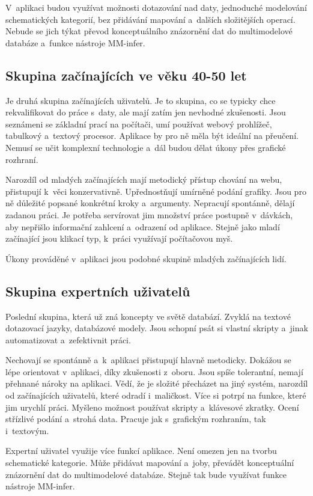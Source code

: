 V~aplikaci budou využívat možnosti dotazování nad daty, jednoduché modelování schematických kategorií, bez přidávání mapování a~dalších složitějších operací. Nebude se jich týkat převod konceptuálního znázornění dat do multimodelové databáze a~funkce nástroje MM-infer.

\subsection{Skupina začínajících ve věku 40-50 let}

Je druhá skupina začínajících uživatelů. Je to skupina, co se typicky chce rekvalifikovat do práce s~daty, ale mají zatím jen nevhodné zkušenosti. Jsou seznámeni se základní prací na počítači, umí používat webový prohlížeč, tabulkový a~textový procesor. Aplikace by pro ně měla být ideální na přeučení. Nemusí se učit komplexní technologie a~dál budou dělat úkony přes grafické rozhraní.

Narozdíl od mladých začínajících mají metodický přístup chování na webu, přistupují k~věci konzervativně. Upřednostňují umírněné podání grafiky. Jsou pro ně důležité popsané konkrétní kroky a~argumenty. Nepracují spontánně, dělají zadanou práci. Je potřeba servírovat jim množství práce postupně v~dávkách, aby nepřišlo informační zahlcení a~odrazení od aplikace. Stejně jako mladí začínající jsou klikací typ, k~práci využívají počítačovou myš. 

Úkony prováděné v~aplikaci jsou podobné skupině mladých začínajících lidí.

\subsection{Skupina expertních uživatelů}

Poslední skupina, která už zná koncepty ve světě databází. Zvyklá na textové dotazovací jazyky, databázové modely. Jsou schopní psát si vlastní skripty a~jinak automatizovat a~zefektivnit práci.

Nechovají se spontánně a~k~aplikaci přistupují hlavně metodicky. Dokážou se lépe orientovat v~aplikaci, díky zkušenosti z~oboru. Jsou spíše tolerantní, nemají přehnané nároky na aplikaci. Vědí, že je složité přecházet na jiný systém, narozdíl od začínajících uživatelů, které odradí i~maličkost. Více si potrpí na funkce, které jim urychlí práci. Myšleno možnost používat skripty a~klávesové zkratky. Ocení střízlivé podání a~strohá data. Pracuje jak s~grafickým rozhraním, tak i~textovým.

Expertní uživatel využije více funkcí aplikace. Není omezen jen na tvorbu schematické kategorie. Může přidávat mapování a~joby, převádět konceptuální znázornění dat do multimodelové databáze. Stejně tak bude využívat funkce nástroje MM-infer.
